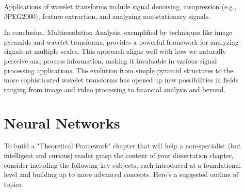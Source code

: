 Applications of wavelet transforms include signal denoising, compression (e.g., JPEG2000), feature extraction, and analyzing non-stationary signals.

In conclusion, Multiresolution Analysis, exemplified by techniques like image pyramids and wavelet transforms, provides a powerful framework for analyzing signals at multiple scales. This approach aligns well with how we naturally perceive and process information, making it invaluable in various signal processing applications. The evolution from simple pyramid structures to the more sophisticated wavelet transforms has opened up new possibilities in fields ranging from image and video processing to financial analysis and beyond.


\section{Neural Networks}

To build a "Theoretical Framework" chapter that will help a non-specialist (but intelligent and curious) reader grasp the content of your dissertation chapter, consider including the following key subjects, each introduced at a foundational level and building up to more advanced concepts. Here’s a suggested outline of topics:


